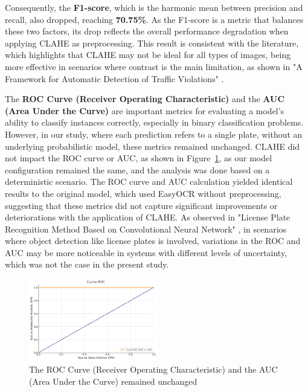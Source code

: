 \documentclass[conference]{IEEEtran}
\begin{document}
	Consequently, the \textbf{F1-score}, which is the harmonic mean between precision and recall, also dropped, reaching \textbf{70.75\%}. As the F1-score is a metric that balances these two factors, its drop reflects the overall performance degradation when applying CLAHE as preprocessing. This result is consistent with the literature, which highlights that CLAHE may not be ideal for all types of images, being more effective in scenarios where contrast is the main limitation, as shown in "A Framework for Automatic Detection of Traffic Violations" \cite{b12}.
	
	The \textbf{ROC Curve (Receiver Operating Characteristic)} and the \textbf{AUC (Area Under the Curve)} are important metrics for evaluating a model's ability to classify instances correctly, especially in binary classification problems. However, in our study, where each prediction refers to a single plate, without an underlying probabilistic model, these metrics remained unchanged. CLAHE did not impact the ROC curve or AUC, as shown in Figure~\ref{img10}, as our model configuration remained the same, and the analysis was done based on a deterministic scenario. The ROC curve and AUC calculation yielded identical results to the original model, which used EasyOCR without preprocessing, suggesting that these metrics did not capture significant improvements or deteriorations with the application of CLAHE. As observed in "License Plate Recognition Method Based on Convolutional Neural Network" \cite{b14}, in scenarios where object detection like license plates is involved, variations in the ROC and AUC may be more noticeable in systems with different levels of uncertainty, which was not the case in the present study.
	
	\begin{figure}[htbp]
		\centerline{\includegraphics[width=0.5\textwidth]{img10.png}}
		\caption{The ROC Curve (Receiver Operating Characteristic) and the AUC (Area Under the Curve) remained unchanged}
		\label{img10}
	\end{figure}
	
\end{document}

